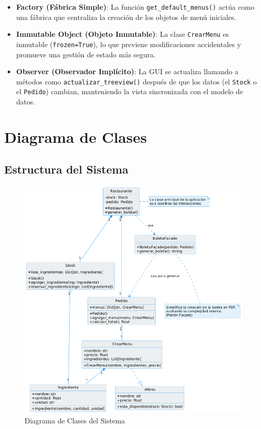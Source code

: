 \documentclass[12pt,letterpaper]{article}
\begin{document}
\begin{itemize}
    \item \textbf{Factory (Fábrica Simple)}: La función \texttt{get\_default\_menus()} actúa como una fábrica que centraliza la creación de los objetos de menú iniciales.
    
    \item \textbf{Immutable Object (Objeto Inmutable)}: La clase \texttt{CrearMenu} es inmutable (\texttt{frozen=True}), lo que previene modificaciones accidentales y promueve una gestión de estado más segura.
    
    \item \textbf{Observer (Observador Implícito)}: La GUI se actualiza llamando a métodos como \texttt{actualizar\_treeview()} después de que los datos (el \texttt{Stock} o el \texttt{Pedido}) cambian, manteniendo la vista sincronizada con el modelo de datos.
\end{itemize}

\section{Diagrama de Clases}
\subsection{Estructura del Sistema}
\begin{figure}[H]
    \centering
    \includegraphics[width=\textwidth]{./images/diagrama.png}
    \caption{Diagrama de Clases del Sistema}\label{fig:diagrama}
\end{figure}
\clearpage %
\end{document}
